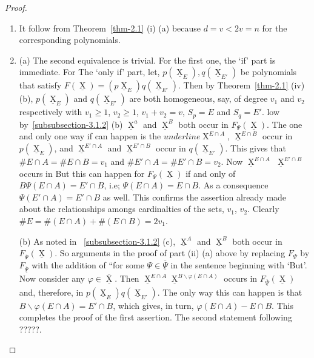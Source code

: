 \documentclass[a4paper,12pt]{article}
\DeclareMathOperator{\x}{\mathrm{X}}
\theoremstyle{definition}
\theoremstyle{underlinethm}
\theoremstyle{underline}
\begin{document}
\begin{proof}
\begin{enumerate}[label=(\roman*)]
 
 \item  It follow from Theorem~\ref{thm-2.1} (i) (a) because $d=v < 2 v =n$ for the corresponding polynomials. 

\item (a) The second equivalence is trivial. For the first one, the `if' part is immediate. For The  `only if' part, let, $p(\underline{\x}_{E}), q (\underline{\x}_{E'})$ be polynomials that satisfy $F(\underline{\x}) = (p\underline{\x}_{E}) q (\underline{\x}_{E'})$. Then by Theorem~\ref{thm-2.1} (iv) (b), $p(\underline{\x}_{E})$ and $q(\underline{\x}_{E'})$ are both homogeneous, say, of degree $v_{1}$ and $v_{2}$ respectively with $v_{1} \geq 1$, $v_{2} \geq 1$, $v_{1} + v_{2} = v$, $S_{p} =E$ and $S_{q} = E'$.  low by~\ref{subsubsection-3.1.2} (b) $\underline{\x}^{a}$ and $\underline{\x}^{B}$ both occur in $F_{\Psi}(\underline{\x})$. The one and only one way if can happen is the $underline{\x}^{E \cap A}$, $\underline{\x}^{E \cap B}$ occur in $p(\underline{\x}_{E})$, and $\underline{\x}^{E' \cap A}$ and $\underline{\x}^{E' \cap B}$ occur in $q(\underline{\x}_{E'})$. This gives that $\# E \cap A = \# E \cap B = v_{1}$ and $\# E' \cap A = \# E' \cap B =v_{2}$. Now $\underline{\x}^{E \cap A}$ $\underline{\x}^{E' \cap B}$ occurs in But this can happen for $F_{\Psi} (\underline{\x})$ if and only of $B \Psi(E \cap A) = E' \cap B$, i.e; $\Psi(E \cap A) = E \cap B$. As a consequence $\Psi (E' \cap A) = E' \cap B$ as well. This confirms the assertion already made about the relationships amongs cardinalties of the sets, $v_{1}$, $v_{2}$. Clearly $\# E = \# (E \cap A) + \# (E \cap B) = 2 v_{1}$.

(b) As noted in ~\ref{subsubsection-3.1.2} (c), $\underline{\x}^{A}$ and $\underline{\x}^{B}$ both occur in $F_{\overline{\Psi}}(\underline{\x})$. So arguments in the proof of part (ii) (a) above by replacing $F_{\Psi}$ by $F_{\underline{\overline{\Psi}}}$ with the addition of ``for some $\Psi \in \underline{\overline{\Psi}}$ in the sentence beginning with `But'. Now consider any $\varphi \in \underline{\overline{\x}}$. Then $\underline{\x}^{E \cap A} \underline{\x}^{B \smallsetminus \varphi (E \cap A)}$ occurs in $F_{\underline{\overline{\Psi}}}(\underline{\x})$ and, therefore, in $p(\underline{\x}_{E}) q(\underline{\x}_{E'})$. The only way this can happen is that $B \smallsetminus \varphi (E \cap A) = E' \cap B$, which gives, in turn, $\varphi(E \cap A) - E \cap B$. This completes the proof of the first assertion. The second statement following ?????.


\end{enumerate}
\end{proof}
\end{document}
